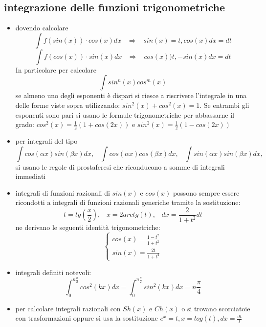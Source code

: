 \documentclass[a4paper, 9pt]{report}
\begin{document}
\subsection*{integrazione delle funzioni trigonometriche}
\begin{itemize}
    \item dovendo calcolare
    \[
        \int f(sin(x)) \cdot  cos(x) dx \;\;\; \Rightarrow  \;\;\; sin(x) = t, cos(x) dx =dt
    \]
    \[
        \int f(cos(x)) \cdot  sin(x) dx\;\;\; \Rightarrow  \;\;\; cos(x) ) t, -sin(x) dx = dt
    \]
    In particolare per calcolare 
    \[
        \int sin^n(x) cos^m(x)
    \]
    se almeno uno degli esponenti è dispari si riesce a riscrivere l'integrale in una delle forme viste sopra utilizzando: $sin^2(x) + cos^2(x) = 1$. Se entrambi gli esponenti sono pari si usano le formule trigonometriche per abbassarne il grado: $cos^2(x) = \frac{1}{2}(1+cos(2x))$ e $sin^2(x) = \frac{1}{2} (1-cos(2x))$
    \item per integrali del tipo
    \[
        \int cos(\alpha x) sin(\beta x) dx, \;\;\;\int cos(\alpha x) cos(\beta x) dx, \;\;\;\int sin(\alpha x) sin(\beta x) dx,
    \]
    si usano le regole di prostaferesi che riconducono a somme di integrali immediati
    \item integrali di funzioni razionali di $sin(x)$ e $cos(x)$ possono sempre essere ricondotti a integrali di funzioni razionali generiche tramite la sostituzione:
    \[
        t = tg\left(\frac{x}{2}\right), \;\;\; x= 2 arctg(t), \;\;\;dx = \frac{2}{1+t^2}dt
    \]
    ne derivano le seguenti identità trigonometriche:
    \[
        \begin{cases}
            cos(x) = \frac{1-t^2}{1+t^2}\\
            sin(x) = \frac{2t}{1+t^2}
        \end{cases}
    \]
    \item integrali definiti notevoli:
    \[
        \int_{0}^{n \frac{\pi}{2}}cos^2(kx) dx = \int_{0}^{n \frac{\pi}{2}}sin^2(kx) dx = n \frac{\pi}{4}
    \]
    \item per calcolare integrali razionali con $Sh(x)$ e $Ch(x)$ o si trovano scorciatoie con trasformazioni oppure si usa la sostituzione $e^x = t, x= log(t), dx = \frac{dt}{t}$
\end{itemize}
\end{document}
